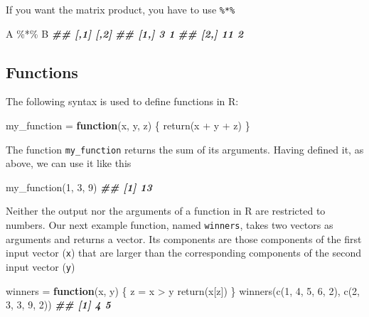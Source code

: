 \documentclass[
]{book}
\newenvironment{Shaded}{\begin{snugshade}}{\end{snugshade}}
\newcommand{\ControlFlowTok}[1]{\textcolor[rgb]{0.13,0.29,0.53}{\textbf{#1}}}
\newcommand{\DecValTok}[1]{\textcolor[rgb]{0.00,0.00,0.81}{#1}}
\newcommand{\DocumentationTok}[1]{\textcolor[rgb]{0.56,0.35,0.01}{\textbf{\textit{#1}}}}
\newcommand{\FunctionTok}[1]{\textcolor[rgb]{0.00,0.00,0.00}{#1}}
\newcommand{\NormalTok}[1]{#1}
\newcommand{\OtherTok}[1]{\textcolor[rgb]{0.56,0.35,0.01}{#1}}
\newcommand{\SpecialCharTok}[1]{\textcolor[rgb]{0.00,0.00,0.00}{#1}}
\theoremstyle{definition}
\theoremstyle{definition}
\theoremstyle{definition}
\theoremstyle{definition}
\theoremstyle{remark}
\begin{document}
If you want the matrix product, you have to use \texttt{\%*\%}

\begin{Shaded}
\begin{Highlighting}[]
\NormalTok{A }\SpecialCharTok{\%*\%}\NormalTok{ B}
\DocumentationTok{\#\#      [,1] [,2]}
\DocumentationTok{\#\# [1,]    3    1}
\DocumentationTok{\#\# [2,]   11    2}
\end{Highlighting}
\end{Shaded}

\hypertarget{functions}{%
\subsection{Functions}\label{functions}}

The following syntax is used to define functions in R:

\begin{Shaded}
\begin{Highlighting}[]
\NormalTok{my\_function }\OtherTok{=} \ControlFlowTok{function}\NormalTok{(x, y, z) \{}
    \FunctionTok{return}\NormalTok{(x }\SpecialCharTok{+}\NormalTok{ y }\SpecialCharTok{+}\NormalTok{ z)}
\NormalTok{\}}
\end{Highlighting}
\end{Shaded}

The function \texttt{my\_function} returns the sum of its arguments. Having defined it, as above, we can use it like this

\begin{Shaded}
\begin{Highlighting}[]
\FunctionTok{my\_function}\NormalTok{(}\DecValTok{1}\NormalTok{, }\DecValTok{3}\NormalTok{, }\DecValTok{9}\NormalTok{)}
\DocumentationTok{\#\# [1] 13}
\end{Highlighting}
\end{Shaded}

Neither the output nor the arguments of a function in R are restricted to numbers. Our next example function, named \texttt{winners}, takes two vectors as arguments and returns a vector. Its components are those components of the first input vector (\texttt{x}) that are larger than the corresponding components of the second input vector (\texttt{y})

\begin{Shaded}
\begin{Highlighting}[]
\NormalTok{winners }\OtherTok{=} \ControlFlowTok{function}\NormalTok{(x, y) \{}
\NormalTok{    z }\OtherTok{=}\NormalTok{ x }\SpecialCharTok{\textgreater{}}\NormalTok{ y}
    \FunctionTok{return}\NormalTok{(x[z])}
\NormalTok{\}}
\FunctionTok{winners}\NormalTok{(}\FunctionTok{c}\NormalTok{(}\DecValTok{1}\NormalTok{, }\DecValTok{4}\NormalTok{, }\DecValTok{5}\NormalTok{, }\DecValTok{6}\NormalTok{, }\DecValTok{2}\NormalTok{), }\FunctionTok{c}\NormalTok{(}\DecValTok{2}\NormalTok{, }\DecValTok{3}\NormalTok{, }\DecValTok{3}\NormalTok{, }\DecValTok{9}\NormalTok{, }\DecValTok{2}\NormalTok{))}
\DocumentationTok{\#\# [1] 4 5}
\end{Highlighting}
\end{Shaded}
\end{document}
